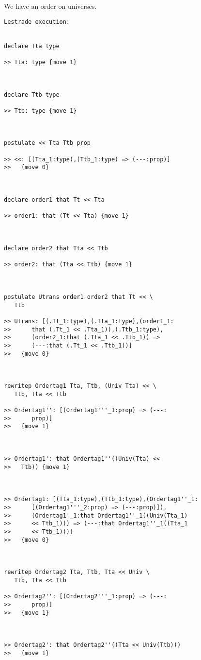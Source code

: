 \documentclass{article}
\begin{document}
We have an order on universes.

\begin{verbatim}Lestrade execution:


declare Tta type

>> Tta: type {move 1}



declare Ttb type

>> Ttb: type {move 1}



postulate << Tta Ttb prop

>> <<: [(Tta_1:type),(Ttb_1:type) => (---:prop)]
>>   {move 0}



declare order1 that Tt << Tta

>> order1: that (Tt << Tta) {move 1}



declare order2 that Tta << Ttb

>> order2: that (Tta << Ttb) {move 1}



postulate Utrans order1 order2 that Tt << \
   Ttb

>> Utrans: [(.Tt_1:type),(.Tta_1:type),(order1_1:
>>      that (.Tt_1 << .Tta_1)),(.Ttb_1:type),
>>      (order2_1:that (.Tta_1 << .Ttb_1)) =>
>>      (---:that (.Tt_1 << .Ttb_1))]
>>   {move 0}



rewritep Ordertag1 Tta, Ttb, (Univ Tta) << \
   Ttb, Tta << Ttb

>> Ordertag1'': [(Ordertag1'''_1:prop) => (---:
>>      prop)]
>>   {move 1}



>> Ordertag1': that Ordertag1''((Univ(Tta) <<
>>   Ttb)) {move 1}



>> Ordertag1: [(Tta_1:type),(Ttb_1:type),(Ordertag1''_1:
>>      [(Ordertag1'''_2:prop) => (---:prop)]),
>>      (Ordertag1'_1:that Ordertag1''_1((Univ(Tta_1)
>>      << Ttb_1))) => (---:that Ordertag1''_1((Tta_1
>>      << Ttb_1)))]
>>   {move 0}



rewritep Ordertag2 Tta, Ttb, Tta << Univ \
   Ttb, Tta << Ttb

>> Ordertag2'': [(Ordertag2'''_1:prop) => (---:
>>      prop)]
>>   {move 1}



>> Ordertag2': that Ordertag2''((Tta << Univ(Ttb)))
>>   {move 1}




\end{verbatim}
\end{document}
